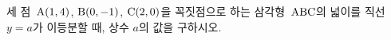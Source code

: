 세 점~$\mathrm{A}(1{,}\mkern3mu\mathopen{}4)$, $\mathrm{B}(0{,}\mkern3mu\mathopen{}-1)$, $\mathrm{C}(2{,}\mkern3mu\mathopen{}0)$을 꼭짓점으로 하는 삼각형~$\mathrm{ABC}$의 넓이를 직선~$y=a$가 이등분할 때, 상수 $a$의 값을 구하시오.
